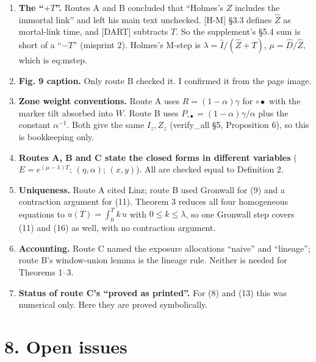 \documentclass[10pt,]{article}
\providecommand{\tightlist}{%
  \setlength{\itemsep}{0pt}\setlength{\parskip}{0pt}}
\begin{document}
\begin{enumerate}
\def\labelenumi{\arabic{enumi}.}
\tightlist
\item
  \textbf{The ``\(+T\)''.} Routes A and B concluded that ``Holmes's
  \(Z\) includes the immortal link'' and left his main text unchecked.
  {[}H-M{]} §3.3 defines \(\hat Z\) as mortal-link time, and {[}DART{]}
  subtracts \(T\). So the supplement's §5.4 sum is short of a ``\(-T\)''
  (misprint 2). Holmes's M-step is \(\lambda=\hat I/(\hat Z+T)\),
  \(\mu=\hat D/\hat Z\), which is eq:mstep.
\item
  \textbf{Fig. 9 caption.} Only route B checked it. I confirmed it from
  the page image.
\item
  \textbf{Zone weight conventions.} Route A uses \(R=(1-\alpha)\gamma\)
  for \(\circ\bullet\) with the marker tilt absorbed into \(W\). Route B
  uses \(P_{\circ\bullet}=(1-\alpha)\gamma/\alpha\) plus the constant
  \(\alpha^{-1}\). Both give the same \(I_z,Z_z\) (verify\_all §5,
  Proposition 6), so this is bookkeeping only.
\item
  \textbf{Routes A, B and C state the closed forms in different
  variables} (\(E=e^{(\mu-\lambda)T}\); \((\eta,\alpha)\); \((x,y)\)).
  All are checked equal to Definition 2.
\item
  \textbf{Uniqueness.} Route A cited Linz; route B used Gronwall for (9)
  and a contraction argument for (11). Theorem 3 reduces all four
  homogeneous equations to \(u(T)=\int_0^Tk\,u\) with
  \(0\le k\le\lambda\), so one Gronwall step covers (11) and (16) as
  well, with no contraction argument.
\item
  \textbf{Accounting.} Route C named the exposure allocations ``naive''
  and ``lineage''; route B's window-union lemma is the lineage rule.
  Neither is needed for Theorems 1--3.
\item
  \textbf{Status of route C's ``proved as printed''.} For (8) and (13)
  this was numerical only. Here they are proved symbolically.
\end{enumerate}

\hypertarget{open-issues}{%
\section{8. Open issues}\label{open-issues}}
\end{document}
